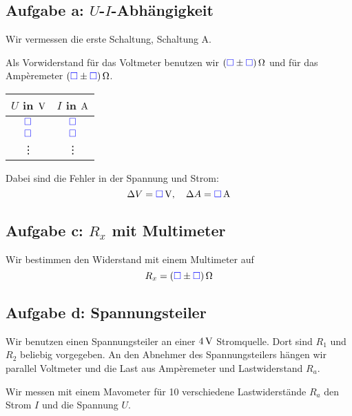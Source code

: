 \documentclass[11pt,german]{article}
\newcommand{\messwert}{\textcolor{blue}{\square}}
\begin{document}
\subsection{Aufgabe a: $U$-$I$-Abhängigkeit}

\label{durchführung-a}

Wir vermessen die erste Schaltung, Schaltung A.

Als Vorwiderstand für das Voltmeter benutzen wir $\unit[(\messwert \pm
\messwert)] \Omega$ und für das Ampèremeter $\unit[(\messwert \pm \messwert)]
\Omega$.

\begin{center}
	\begin{tabular}{cc}
		$U$ in $\unit V$ & $I$ in $\unit A$ \\
		\hline
		$\messwert$ & $\messwert$ \\
		$\messwert$ & $\messwert$ \\
			 \vdots & \vdots
	\end{tabular}
\end{center}

Dabei sind die Fehler in der Spannung und Strom:
\[ \Delta V = \unit[\messwert]V, \quad \Delta A = \unit[\messwert] A \]

\subsection{Aufgabe c: $R_x$ mit Multimeter}

Wir bestimmen den Widerstand mit einem Multimeter auf
\[ R_x = \unit[(\messwert \pm \messwert)]{\Omega} \]

\subsection{Aufgabe d: Spannungsteiler}

\label{durchführung-d}

Wir benutzen einen Spannungsteiler an einer $\unit[4]V$ Stromquelle. Dort sind
$R_1$ und $R_2$ beliebig vorgegeben. An den Abnehmer des Spannungsteilers
hängen wir parallel Voltmeter und die Last aus Ampèremeter und Lastwiderstand
$R_a$.

Wir messen mit einem Mavometer für 10 verschiedene Lastwiderstände $R_a$ den
Strom $I$ und die Spannung $U$.
\end{document}

